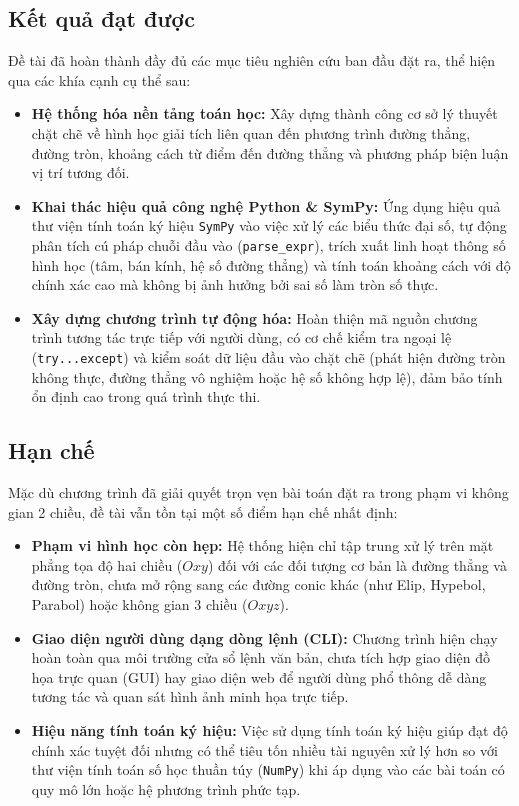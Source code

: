 \documentclass[12pt,a4paper]{article}
\begin{document}
\subsection{Kết quả đạt được}

Đề tài đã hoàn thành đầy đủ các mục tiêu nghiên cứu ban đầu đặt ra, thể hiện qua các khía cạnh cụ thể sau:

\begin{itemize}
    \item \textbf{Hệ thống hóa nền tảng toán học:} Xây dựng thành công cơ sở lý thuyết chặt chẽ về hình học giải tích liên quan đến phương trình đường thẳng, đường tròn, khoảng cách từ điểm đến đường thẳng và phương pháp biện luận vị trí tương đối.
    \item \textbf{Khai thác hiệu quả công nghệ Python \& SymPy:} Ứng dụng hiệu quả thư viện tính toán ký hiệu \texttt{SymPy} vào việc xử lý các biểu thức đại số, tự động phân tích cú pháp chuỗi đầu vào (\texttt{parse\_expr}), trích xuất linh hoạt thông số hình học (tâm, bán kính, hệ số đường thẳng) và tính toán khoảng cách với độ chính xác cao mà không bị ảnh hưởng bởi sai số làm tròn số thực.
    \item \textbf{Xây dựng chương trình tự động hóa:} Hoàn thiện mã nguồn chương trình tương tác trực tiếp với người dùng, có cơ chế kiểm tra ngoại lệ (\texttt{try...except}) và kiểm soát dữ liệu đầu vào chặt chẽ (phát hiện đường tròn không thực, đường thẳng vô nghiệm hoặc hệ số không hợp lệ), đảm bảo tính ổn định cao trong quá trình thực thi.
\end{itemize}

\subsection{Hạn chế}

Mặc dù chương trình đã giải quyết trọn vẹn bài toán đặt ra trong phạm vi không gian 2 chiều, đề tài vẫn tồn tại một số điểm hạn chế nhất định:

\begin{itemize}
    \item \textbf{Phạm vi hình học còn hẹp:} Hệ thống hiện chỉ tập trung xử lý trên mặt phẳng tọa độ hai chiều ($Oxy$) đối với các đối tượng cơ bản là đường thẳng và đường tròn, chưa mở rộng sang các đường conic khác (như Elip, Hypebol, Parabol) hoặc không gian 3 chiều ($Oxyz$).
    \item \textbf{Giao diện người dùng dạng dòng lệnh (CLI):} Chương trình hiện chạy hoàn toàn qua môi trường cửa sổ lệnh văn bản, chưa tích hợp giao diện đồ họa trực quan (GUI) hay giao diện web để người dùng phổ thông dễ dàng tương tác và quan sát hình ảnh minh họa trực tiếp.
    \item \textbf{Hiệu năng tính toán ký hiệu:} Việc sử dụng tính toán ký hiệu giúp đạt độ chính xác tuyệt đối nhưng có thể tiêu tốn nhiều tài nguyên xử lý hơn so với thư viện tính toán số học thuần túy (\texttt{NumPy}) khi áp dụng vào các bài toán có quy mô lớn hoặc hệ phương trình phức tạp.
\end{itemize}
\end{document}
